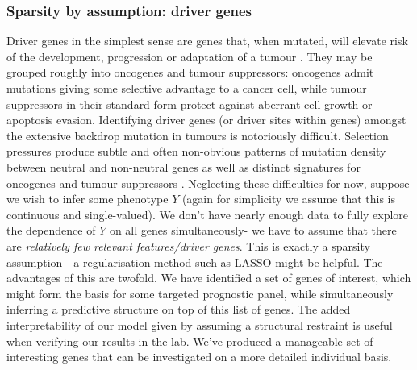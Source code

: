 \documentclass[thesis.tex]{subfiles}
\begin{document}
\subsubsection{Sparsity by assumption: driver genes}
Driver genes in the simplest sense are genes that, when mutated, will elevate risk of the development, progression or adaptation of a tumour \citep{hanahan_hallmarks_2000, hanahan_hallmarks_2011}. They may be grouped roughly into oncogenes and tumour suppressors: oncogenes admit mutations giving some selective advantage to a cancer cell, while tumour suppressors in their standard form protect against aberrant cell growth or apoptosis evasion. Identifying driver genes (or driver sites within genes) amongst the extensive backdrop mutation in tumours is notoriously difficult. Selection pressures produce subtle and often non-obvious patterns of mutation density between neutral and non-neutral genes as well as distinct signatures for oncogenes and tumour suppressors \citep{brown_finding_2019}. Neglecting these difficulties for now, suppose we wish to infer some phenotype $Y$ (again for simplicity we assume that this is continuous and single-valued). We don't have nearly enough data to fully explore the dependence of $Y$ on all genes simultaneously- we have to assume that there are \textit{relatively few relevant features/driver genes}. This is exactly a sparsity assumption - a regularisation method such as LASSO might be helpful. The advantages of this are twofold. We have identified a set of genes of interest, which might form the basis for some targeted prognostic panel, while simultaneously inferring a predictive structure on top of this list of genes. The added interpretability of our model given by assuming a structural restraint is useful when verifying our results in the lab. We've produced a manageable set of interesting genes that can be investigated on a more detailed individual basis.
\end{document}
